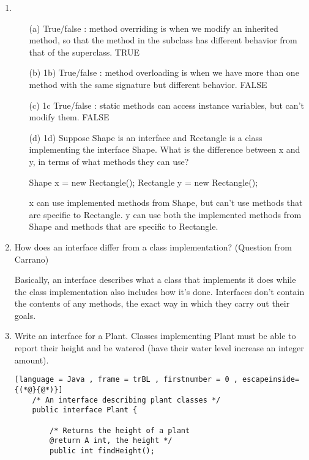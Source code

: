 \documentclass[letter]{article}
\def\coursename{CS 201: Data Structures}
\newcommand{\header}[1]{%
	\begin{center}
		\fbox{
			\begin{minipage}{6in}
				\textbf{\coursename} \hfill       \\
				\textit{#1} \hfill \textit{\today}
			\end{minipage}
		}
	\end{center}
	\vspace*{4mm}
}
\begin{document}
\header{Week 2 Answer}

\begin{enumerate} [1.]
    \item 
    \begin{itemize}
        \item [(a)] True/false : method overriding is when we modify an inherited method, so that the method in the subclass has different behavior from that of the superclass. TRUE
        \item [(b)] 1b) True/false : method overloading is when we have more than one method with the same signature but different behavior. FALSE
        \item [(c)] 1c True/false : static methods can access instance variables, but can’t modify them. FALSE
        \item [(d)] 1d) Suppose Shape is an interface and Rectangle is a class implementing the interface Shape. What is the difference between x and y, in terms of what methods they can use?
        
        
        Shape x = new Rectangle();
        Rectangle y = new Rectangle();

        x can use implemented methods from Shape, but can’t use methods that are specific to Rectangle.
        y can use both the implemented methods from Shape and methods that are specific to Rectangle.
    \end{itemize}

    \item How does an interface differ from a class implementation? (Question from Carrano)

    Basically, an interface describes what a class that implements it does
    while the class implementation also includes how it's done. Interfaces don’t
    contain the contents of any methods, the exact way in which they carry out
    their goals.

    \item Write an interface for a Plant. Classes implementing Plant must be able to report their height and be watered (have their water level increase an integer amount).

    \begin{lstlisting}[language = Java , frame = trBL , firstnumber = 0 , escapeinside={(*@}{@*)}]
    /* An interface describing plant classes */
    public interface Plant {

        /* Returns the height of a plant 
        @return A int, the height */
        public int findHeight();


\end{lstlisting}
\end{enumerate}
\end{document}
